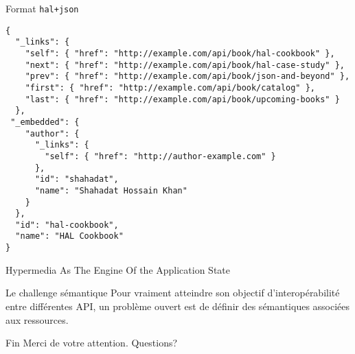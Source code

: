 \documentclass{beamer}
\begin{document}
\begin{frame}[fragile]{Format \verb#hal+json#}
\scriptsize
\begin{verbatim}
{
  "_links": {
    "self": { "href": "http://example.com/api/book/hal-cookbook" },
    "next": { "href": "http://example.com/api/book/hal-case-study" },
    "prev": { "href": "http://example.com/api/book/json-and-beyond" },
    "first": { "href": "http://example.com/api/book/catalog" },
    "last": { "href": "http://example.com/api/book/upcoming-books" }
  },
 "_embedded": {
    "author": {
      "_links": {
        "self": { "href": "http://author-example.com" }
      },
      "id": "shahadat",
      "name": "Shahadat Hossain Khan"
    }
  },
  "id": "hal-cookbook",
  "name": "HAL Cookbook"
}
\end{verbatim}
\end{frame}

\begin{frame}[fragile]{Hypermedia As The Engine Of the Application State}
  \begin{center}
    \resizebox{1.0\textwidth}{!} {%
    }
  \end{center}
\end{frame}

\begin{frame}{Le challenge sémantique}
  Pour vraiment atteindre son objectif d'interopérabilité entre
  différentes API, un problème ouvert est de définir des sémantiques
  associées aux ressources.
\end{frame}

\begin{frame}{Fin}
  Merci de votre attention. Questions?
\end{frame}
\end{document}
